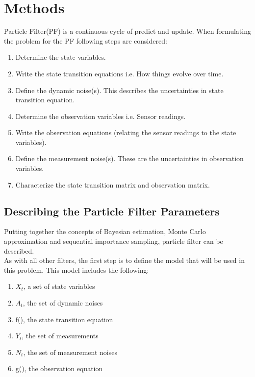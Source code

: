 \documentclass[12pt]{article}
\begin{document}
\section{Methods}
Particle Filter(PF) is a continuous cycle of predict and update. When formulating the problem for the PF following steps are considered:
\begin{enumerate}
	\item Determine the state variables.
	\item Write the state transition equations i.e. How things evolve over time.
	\item Define the dynamic noise(s).  This describes the uncertainties in state transition equation.
	\item Determine the observation variables i.e. Sensor readings.
	\item Write the observation equations (relating the sensor readings to the state variables).
	\item Define the measurement noise(s). These are the uncertainties in observation variables.
	\item Characterize the state transition matrix and observation matrix.
\end{enumerate}

\subsection{Describing the Particle Filter Parameters}
Putting together the concepts of Bayesian estimation, Monte Carlo approximation and sequential importance sampling, particle filter can be described. \\
As with all other filters, the first step is to define the model that will be used in this problem. This model includes the following: 
\begin{enumerate}
\item $X_t$, a set of state variables
\item $A_t$, the set of dynamic noises
\item f(), the state transition equation
\item $Y_t$, the set of measurements
\item $N_t$, the set of measurement noises
\item g(), the observation equation
\end{enumerate}
\end{document}
